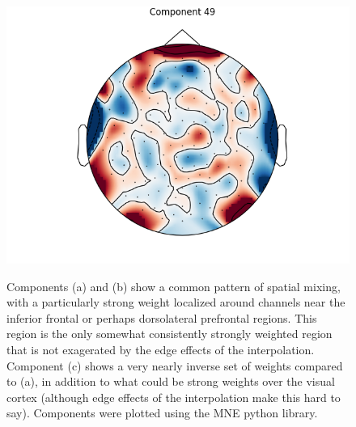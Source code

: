 \documentclass[fleqn,10pt]{wlscirep}
\begin{document}
\begin{figure}[h!]
\begin{minipage}{0.31\textwidth}
    \includegraphics[width=\linewidth]{max_act/49.png}
    \subcaption{}
    \label{fig:component_49}
  \end{minipage}
  \caption[textfind]{Components (a) and (b) show a common pattern of spatial mixing, with a particularly strong weight localized around channels near the inferior frontal or perhaps dorsolateral prefrontal regions. This region is the only somewhat consistently strongly weighted region that is not exagerated by the edge effects of the interpolation. Component (c) shows a very nearly inverse set of weights compared to (a), in addition to what could be strong weights over the visual cortex (although edge effects of the interpolation make this hard to say). Components were plotted using the MNE python library. \footnotemark} \label{fig:max_components}
\end{figure}
\end{document}
